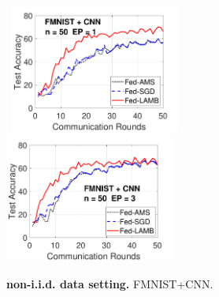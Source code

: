 \documentclass[twoside]{article}
\begin{document}
 \begin{figure}[H]
    \begin{center}
        \mbox{
        \hspace{-0.05in}\includegraphics[width=0.5\textwidth]{new_fmnist_mnist_fig/fmnist_testerror_cnn_ep1_iid0.pdf}
        \hspace{-0.1in}\includegraphics[width=0.5\textwidth]{new_fmnist_mnist_fig/fmnist_testerror_cnn_ep3_iid0.pdf}
        }
    \end{center}
    \vspace{0.05in}
	\caption{\textbf{non-i.i.d. data setting.} FMNIST+CNN.}
	\label{fig:noniid_fmnist}
	\vspace{-0.1in}
\end{figure}
  
  


\end{document}
